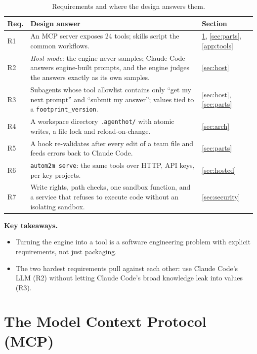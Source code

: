 \documentclass[10pt,a4paper]{article}
\newcommand{\cc}{Claude Code}
\newcommand{\code}[1]{\texttt{#1}}
\newcommand{\file}[1]{\texttt{#1}}
\newenvironment{takeaway}{%
  \begin{tcolorbox}[enhanced, breakable, colback=keybg, colframe=keybg, arc=0pt, boxrule=0pt,
     borderline west={2.2pt}{0pt}{keybar}, left=8pt, right=8pt, top=5pt, bottom=5pt,
     before skip=8pt, after skip=8pt]
  \textsf{\bfseries\color{keybar}Key takeaways.}\par\smallskip}{\end{tcolorbox}}
\begin{document}
\begin{table}[!htb]
\centering\small
\caption{Requirements and where the design answers them.}
\label{tab:req}
\begin{tabularx}{\textwidth}{@{}l Y l@{}}
\toprule
Req. & Design answer & Section \\
\midrule
R1 & An MCP server exposes 24 tools; skills script the common workflows. & \ref{sec:mcp}, \ref{sec:parts}, \ref{app:tools} \\
R2 & \emph{Host mode}: the engine never samples; \cc{} answers engine-built prompts, and the engine judges the answers exactly as its own samples. & \ref{sec:host} \\
R3 & Subagents whose tool allowlist contains only ``get my next prompt'' and ``submit my answer''; values tied to a \code{footprint\_version}. & \ref{sec:host}, \ref{sec:parts} \\
R4 & A workspace directory \file{.agenthot/} with atomic writes, a file lock and reload-on-change. & \ref{sec:arch} \\
R5 & A hook re-validates after every edit of a team file and feeds errors back to \cc{}. & \ref{sec:parts} \\
R6 & \code{autom2m serve}: the same tools over HTTP, API keys, per-key projects. & \ref{sec:hosted} \\
R7 & Write rights, path checks, one sandbox function, and a service that refuses to execute code without an isolating sandbox. & \ref{sec:security} \\
\bottomrule
\end{tabularx}
\end{table}

\begin{takeaway}
\begin{itemize}
\item Turning the engine into a tool is a software engineering problem with
explicit requirements, not just packaging.
\item The two hardest requirements pull against each other: use \cc{}'s LLM
(R2) without letting \cc{}'s broad knowledge leak into values (R3).
\end{itemize}
\end{takeaway}

\section{The Model Context Protocol (MCP)}\label{sec:mcp}
\end{document}
